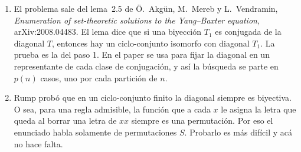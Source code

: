 \documentclass[11pt]{amsproc}
\begin{document}
\begin{enumerate}
  \item El problema sale del lema~2.5 de Ö.~Akgün, M.~Mereb y L.~Vendramin,
        \emph{Enumeration of set-theoretic solutions to the Yang--Baxter
        equation}, arXiv:2008.04483. El lema dice que si una biyección $T_1$
        es conjugada de la diagonal $T$, entonces hay un ciclo-conjunto
        isomorfo con diagonal $T_1$. La prueba es la del paso 1. En el paper
        se usa para fijar la diagonal en un representante de cada clase de
        conjugación, y así la búsqueda se parte en $p(n)$ casos, uno por cada
        partición de $n$.

  \item Rump probó que en un ciclo-conjunto finito la diagonal siempre es
        biyectiva. O sea, para una regla admisible, la función que a cada
        $x$ le asigna la letra que queda al borrar una letra de $xx$ siempre
        es una permutación. Por eso el enunciado habla solamente de
        permutaciones $S$. Probarlo es más difícil y acá no hace falta.
\end{enumerate}
\end{document}
